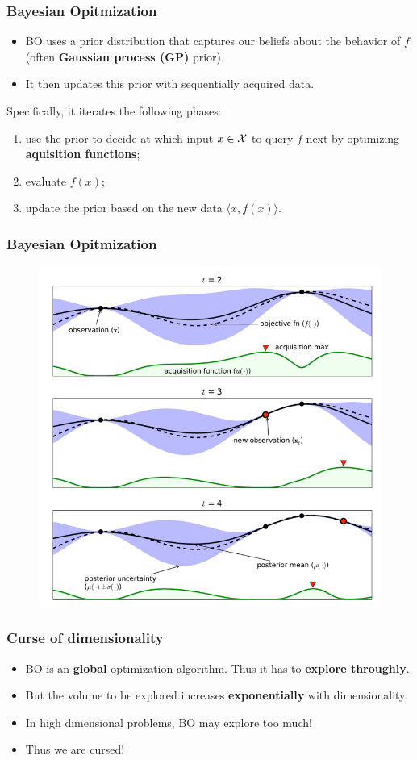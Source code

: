 \documentclass[grey]{beamer}
\begin{document}
\begin{frame}
 \frametitle{Bayesian Opitmization}
 \begin{itemize}
  \item BO uses a prior distribution that captures our beliefs about the behavior of $f$
  (often {\bf \textcolor{myColor}{Gaussian process (GP)}} prior).
  \item It then updates this prior with sequentially acquired data.
 \end{itemize}

 Specifically, it iterates the following phases:
 \begin{enumerate}
  \item use the prior to decide at which input $x\in \cal X$ to query $f$ next
  by optimizing {\bf \textcolor{myColor}{aquisition functions}};
  \item evaluate $f(x)$;
  \item update the prior based on the new data $\langle{}x, f(x)\rangle$.
 \end{enumerate}
\end{frame}

 \begin{frame}
 \frametitle{Bayesian Opitmization}
  \begin{figure}
   \centering
   \includegraphics[width=0.75\columnwidth]
   {./figs/bo}
   \label{fig:traj}
  \end{figure}
 \end{frame}

 \begin{frame}
 \frametitle{Curse of dimensionality}
  \begin{itemize}
   \item BO is an {\bf \textcolor{myColor}{global}} 
    optimization algorithm. Thus it has to 
    {\bf \textcolor{myColor}{explore throughly}}.
   \item But the volume to be explored increases 
   {\bf \textcolor{myColor}{exponentially}} with dimensionality.
   \item In high dimensional problems, BO may explore too much!
   \item Thus we are cursed!
  \end{itemize}
 \end{frame}
\end{document}
